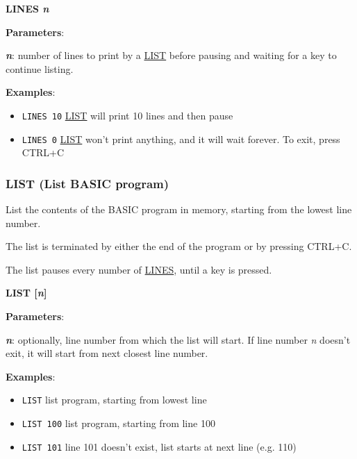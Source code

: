     \hspace{1.9cm}\textbf{LINES \textit{n}}

    \textbf{Parameters}:

    \hspace{1cm}\textbf{\textit{n}}: number of lines to print by a
    \hyperref[msbasic:lang:list]{LIST} before pausing and waiting for a key to
    continue listing.

    \textbf{Examples}:
    \begin{itemize}
        \item \texttt{LINES 10} \hyperref[msbasic:lang:list]{LIST} will print 10
        lines and then pause
        \item \texttt{LINES 0} \hyperref[msbasic:lang:list]{LIST} won't print
        anything, and it will wait forever. To exit, press CTRL+C
    \end{itemize}

    \subsubsection{{LIST (List BASIC program)}}
    \label{msbasic:lang:list}
    List the contents of the BASIC program in memory, starting from the lowest
    line number.

    The list is terminated by either the end of the program or by pressing
    CTRL+C.

    The list pauses every number of \hyperref[msbasic:lang:lines]{LINES}, until a
    key is pressed.

    \hspace{1.9cm}\textbf{LIST [\textit{n}]}

    \textbf{Parameters}:

    \hspace{1cm}\textbf{\textit{n}}: optionally, line number from which the list
    will start. If line number \textit{n} doesn't exit, it will start from next
    closest line number.

    \textbf{Examples}:
    \begin{itemize}
        \item \texttt{LIST} list program, starting from lowest line
        \item \texttt{LIST 100} list program, starting from line 100
        \item \texttt{LIST 101} line 101 doesn't exist, list starts at next line
        (e.g. 110)
    \end{itemize}

